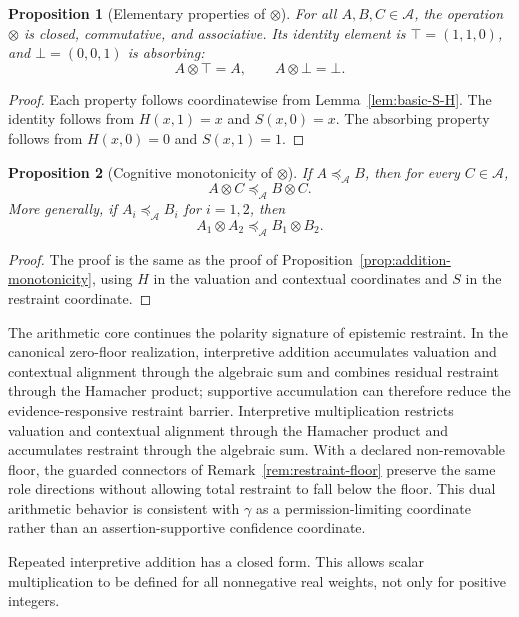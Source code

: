 \documentclass[reqno,final]{amsart}
\theoremstyle{definition}
\theoremstyle{plain}
\newtheorem{proposition}{Proposition}
\theoremstyle{remark}
\providecommand{\cA}{\mathcal{A}}
\providecommand{\preceqA}{\preceq_{\mathcal A}}
\begin{document}
\begin{proposition}[Elementary properties of \(\otimes\)]
\label{prop:multiplication-properties}
For all \(A,B,C\in\cA\), the operation \(\otimes\) is closed, commutative, and associative. Its identity element is \(\top=(1,1,0)\), and \(\bot=(0,0,1)\) is absorbing:
\[
A\otimes\top=A,\qquad A\otimes\bot=\bot.
\]
\end{proposition}

\begin{proof}
Each property follows coordinatewise from Lemma~\ref{lem:basic-S-H}. The identity follows from \(H(x,1)=x\) and \(S(x,0)=x\). The absorbing property follows from \(H(x,0)=0\) and \(S(x,1)=1\).
\end{proof}

\begin{proposition}[Cognitive monotonicity of \(\otimes\)]
\label{prop:multiplication-monotonicity}
If \(A\preceqA B\), then for every \(C\in\cA\),
\[
A\otimes C\preceqA B\otimes C.
\]
More generally, if \(A_i\preceqA B_i\) for \(i=1,2\), then
\[
A_1\otimes A_2\preceqA B_1\otimes B_2.
\]
\end{proposition}

\begin{proof}
The proof is the same as the proof of Proposition~\ref{prop:addition-monotonicity}, using \(H\) in the valuation and contextual coordinates and \(S\) in the restraint coordinate.
\end{proof}

The arithmetic core continues the polarity signature of epistemic restraint. In the canonical zero-floor realization, interpretive addition accumulates valuation and contextual alignment through the algebraic sum and combines residual restraint through the Hamacher product; supportive accumulation can therefore reduce the evidence-responsive restraint barrier. Interpretive multiplication restricts valuation and contextual alignment through the Hamacher product and accumulates restraint through the algebraic sum. With a declared non-removable floor, the guarded connectors of Remark~\ref{rem:restraint-floor} preserve the same role directions without allowing total restraint to fall below the floor. This dual arithmetic behavior is consistent with \(\gamma\) as a permission-limiting coordinate rather than an assertion-supportive confidence coordinate.

Repeated interpretive addition has a closed form. This allows scalar multiplication to be defined for all nonnegative real weights, not only for positive integers.
\end{document}
